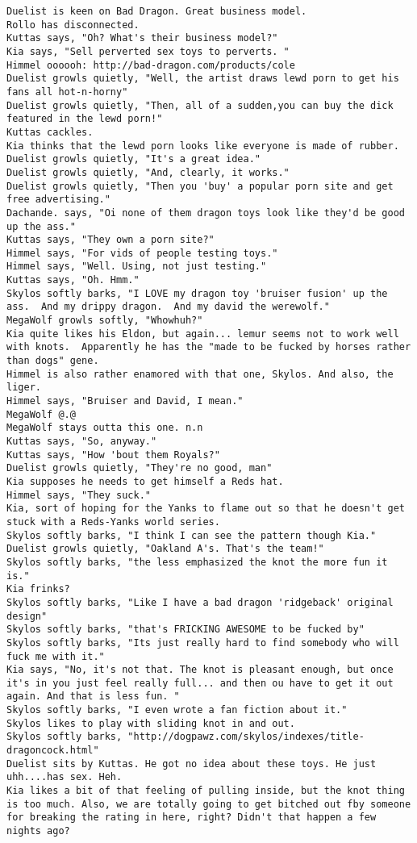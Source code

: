 \begin{verbatim}
Duelist is keen on Bad Dragon. Great business model.
Rollo has disconnected.
Kuttas says, "Oh? What's their business model?"
Kia says, "Sell perverted sex toys to perverts. "
Himmel oooooh: http://bad-dragon.com/products/cole
Duelist growls quietly, "Well, the artist draws lewd porn to get his fans all hot-n-horny"
Duelist growls quietly, "Then, all of a sudden,you can buy the dick featured in the lewd porn!"
Kuttas cackles.
Kia thinks that the lewd porn looks like everyone is made of rubber.
Duelist growls quietly, "It's a great idea."
Duelist growls quietly, "And, clearly, it works."
Duelist growls quietly, "Then you 'buy' a popular porn site and get free advertising."
Dachande. says, "Oi none of them dragon toys look like they'd be good up the ass."
Kuttas says, "They own a porn site?"
Himmel says, "For vids of people testing toys."
Himmel says, "Well. Using, not just testing."
Kuttas says, "Oh. Hmm."
Skylos softly barks, "I LOVE my dragon toy 'bruiser fusion' up the ass.  And my drippy dragon.  And my david the werewolf."
MegaWolf growls softly, "Whowhuh?"
Kia quite likes his Eldon, but again... lemur seems not to work well with knots.  Apparently he has the "made to be fucked by horses rather than dogs" gene.
Himmel is also rather enamored with that one, Skylos. And also, the liger.
Himmel says, "Bruiser and David, I mean."
MegaWolf @.@
MegaWolf stays outta this one. n.n
Kuttas says, "So, anyway."
Kuttas says, "How 'bout them Royals?"
Duelist growls quietly, "They're no good, man"
Kia supposes he needs to get himself a Reds hat.
Himmel says, "They suck."
Kia, sort of hoping for the Yanks to flame out so that he doesn't get stuck with a Reds-Yanks world series.
Skylos softly barks, "I think I can see the pattern though Kia."
Duelist growls quietly, "Oakland A's. That's the team!"
Skylos softly barks, "the less emphasized the knot the more fun it is."
Kia frinks?
Skylos softly barks, "Like I have a bad dragon 'ridgeback' original design"
Skylos softly barks, "that's FRICKING AWESOME to be fucked by"
Skylos softly barks, "Its just really hard to find somebody who will fuck me with it."
Kia says, "No, it's not that. The knot is pleasant enough, but once it's in you just feel really full... and then ou have to get it out again. And that is less fun. "
Skylos softly barks, "I even wrote a fan fiction about it."
Skylos likes to play with sliding knot in and out.
Skylos softly barks, "http://dogpawz.com/skylos/indexes/title-dragoncock.html"
Duelist sits by Kuttas. He got no idea about these toys. He just uhh....has sex. Heh.
Kia likes a bit of that feeling of pulling inside, but the knot thing is too much. Also, we are totally going to get bitched out fby someone for breaking the rating in here, right? Didn't that happen a few nights ago?

\end{verbatim}
